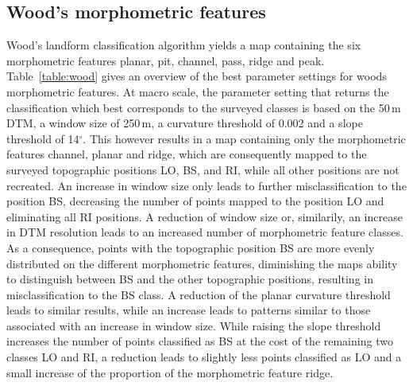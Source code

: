 \documentclass[preprint,12pt,authoryear]{elsarticle}
\begin{document}
\subsection{Wood's morphometric features}
Wood's landform classification algorithm yields a map containing the six morphometric features planar, pit, channel, pass, ridge and peak. Table~\ref{table:wood} gives an overview of the best parameter settings for woods morphometric features.
At macro scale, the parameter setting that returns the classification which best corresponds to the surveyed classes is based on the 50\,m DTM, a window size of 250\,m, a curvature threshold of 0.002 and a slope threshold of 14$^{\circ}$. This however results in a map containing only the morphometric features channel, planar and ridge, which are consequently mapped to the surveyed topographic positions LO, BS, and RI, while all other positions are not recreated. An increase in window size only leads to further misclassification to the position BS, decreasing the number of points mapped to the position LO and eliminating all RI positions. A reduction of window size or, similarily, an increase in DTM resolution leads to an increased number of morphometric feature classes. As a consequence, points with the topographic position BS are more evenly distributed on the different morphometric features, diminishing the maps ability to distinguish between BS and the other topographic positions, resulting in misclassification to the BS class. A reduction of the planar curvature threshold leads to similar results, while an increase leads to patterns similar to those associated with an increase in window size. While raising the slope threshold increases the number of points classified as BS at the cost of the remaining two classes LO and RI, a reduction leads to slightly less points classified as LO and a small increase of the proportion of the morphometric feature ridge. 
\end{document}
